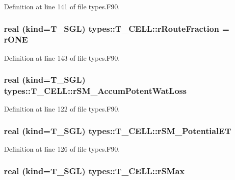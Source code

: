 Definition at line 141 of file types.F90.

\hypertarget{typetypes_1_1_t___c_e_l_l_ab4267240a1e16d985fe629e530e30942}{
\subsubsection[{rRouteFraction}]{\setlength{\rightskip}{0pt plus 5cm}real (kind={\bf T\_\-SGL}) {\bf types::T\_\-CELL::rRouteFraction} = {\bf rONE}}}
\label{typetypes_1_1_t___c_e_l_l_ab4267240a1e16d985fe629e530e30942}


Definition at line 143 of file types.F90.

\hypertarget{typetypes_1_1_t___c_e_l_l_ae70c55ab7eae348ffa8225f8d73ec73d}{
\subsubsection[{rSM\_\-AccumPotentWatLoss}]{\setlength{\rightskip}{0pt plus 5cm}real (kind={\bf T\_\-SGL}) {\bf types::T\_\-CELL::rSM\_\-AccumPotentWatLoss}}}
\label{typetypes_1_1_t___c_e_l_l_ae70c55ab7eae348ffa8225f8d73ec73d}


Definition at line 122 of file types.F90.

\hypertarget{typetypes_1_1_t___c_e_l_l_aaac7498ec7bb6967cb37ecdf98476a2d}{
\subsubsection[{rSM\_\-PotentialET}]{\setlength{\rightskip}{0pt plus 5cm}real (kind={\bf T\_\-SGL}) {\bf types::T\_\-CELL::rSM\_\-PotentialET}}}
\label{typetypes_1_1_t___c_e_l_l_aaac7498ec7bb6967cb37ecdf98476a2d}


Definition at line 126 of file types.F90.

\hypertarget{typetypes_1_1_t___c_e_l_l_a89931b889ff575f122000526cab5ece9}{
\subsubsection[{rSMax}]{\setlength{\rightskip}{0pt plus 5cm}real (kind={\bf T\_\-SGL}) {\bf types::T\_\-CELL::rSMax}}}
\label{typetypes_1_1_t___c_e_l_l_a89931b889ff575f122000526cab5ece9}


